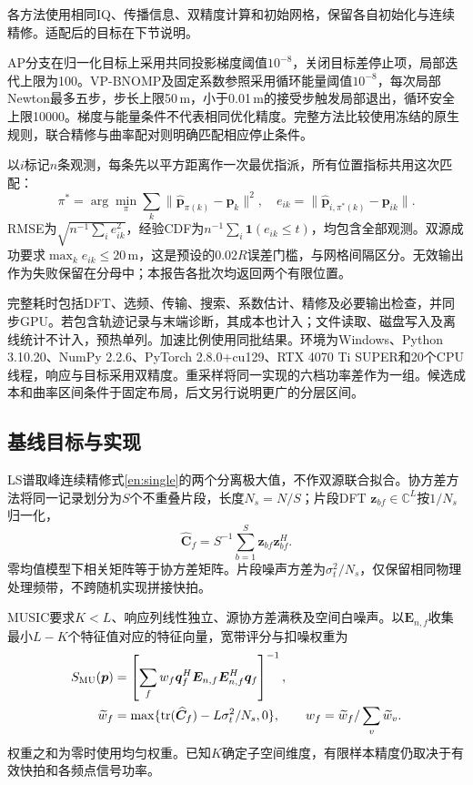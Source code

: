 \documentclass[a4paper,fleqn]{cas-sc}
\newcommand{\C}{\mathbb C}
\newcommand{\tr}{\operatorname{tr}}
\begin{document}
各方法使用相同IQ、传播信息、双精度计算和初始网格，保留各自初始化与连续精修。适配后的目标在下节说明。

AP分支在归一化目标上采用共同投影梯度阈值$10^{-8}$，关闭目标差停止项，局部迭代上限为100。VP-BNOMP及固定系数参照采用循环能量阈值$10^{-8}$，每次局部Newton最多五步，步长上限50\,m，小于0.01\,m的接受步触发局部退出，循环安全上限10000。梯度与能量条件不代表相同优化精度。完整方法比较使用冻结的原生规则，联合精修与曲率配对则明确匹配相应停止条件。

以$i$标记$n$条观测，每条先以平方距离作一次最优指派\cite{Kuhn1955}，所有位置指标共用这次匹配：
\begin{equation}
\pi^*=\arg\min_\pi\sum_k\|\widehat{\bm p}_{\pi(k)}-\bm p_k\|^2,
\quad e_{ik}=\|\widehat{\bm p}_{i,\pi^*(k)}-\bm p_{ik}\|.
\end{equation}
RMSE为$\sqrt{n^{-1}\sum_i e_{ik}^2}$，经验CDF为$n^{-1}\sum_i\mathbf1(e_{ik}\le t)$，均包含全部观测。双源成功要求$\max_k e_{ik}\le20$\,m，这是预设的$0.02R$误差门槛，与网格间隔区分。无效输出作为失败保留在分母中；本报告各批次均返回两个有限位置。

完整耗时包括DFT、选频、传输、搜索、系数估计、精修及必要输出检查，并同步GPU。若包含轨迹记录与末端诊断，其成本也计入；文件读取、磁盘写入及离线统计不计入，预热单列。加速比例使用同批结果。环境为Windows、Python 3.10.20、NumPy 2.2.6、PyTorch 2.8.0+cu129、RTX 4070 Ti SUPER和20个CPU线程，响应与目标采用双精度。重采样将同一实现的六档功率差作为一组。候选成本和曲率区间条件于固定布局，后文另行说明更广的分层区间。

\FloatBarrier
\subsection{基线目标与实现}
LS谱取峰连续精修式\eqref{en:single}的两个分离极大值，不作双源联合拟合。协方差方法将同一记录划分为$S$个不重叠片段，长度$N_s=N/S$；片段DFT $\bm z_{bf}\in\C^L$按$1/N_s$归一化，
\begin{equation}
\widehat{\bm C}_f=S^{-1}\sum_{b=1}^S\bm z_{bf}\bm z_{bf}^H.
\end{equation}
零均值模型下相关矩阵等于协方差矩阵。片段噪声方差为$\sigma_t^2/N_s$，仅保留相同物理处理频带，不跨随机实现拼接快拍。

MUSIC要求$K<L$、响应列线性独立、源协方差满秩及空间白噪声\cite{WeissAmar2005}。以$\bm E_{n,f}$收集最小$L-K$个特征值对应的特征向量，宽带评分与扣噪权重为
\begin{align}
S_{\rm MU}(\bm p)&=\left[\sum_f w_f\bm q_f^H
\bm E_{n,f}\bm E_{n,f}^H\bm q_f\right]^{-1},\\
\widetilde w_f&=\max\{\tr(\widehat{\bm C}_f)-L\sigma_t^2/N_s,0\},
\qquad w_f=\widetilde w_f/\sum_v\widetilde w_v.
\end{align}
权重之和为零时使用均匀权重。已知$K$确定子空间维度，有限样本精度仍取决于有效快拍和各频点信号功率。
\end{document}
